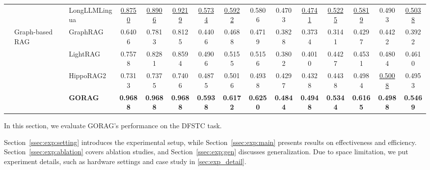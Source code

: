\begin{table}[t]
{\begin{tabular}{l|l|l|ccc|ccc|ccc|ccc}
			&    & LongLLMLingua       \cite{jiang-etal-2024-longllmlingua}              & \underline{0.8750}          &        \underline{0.8906}         & \underline{0.9219}           & \underline{0.5734}          &         \underline{0.5922}        & 0.5806           & 0.4703          &   \underline{0.4741}              & \underline{0.5225}           & \underline{0.5819}          &      0.4903           & \underline{0.5038}            \\	\cline{2-15}
			&             \multirow{4}{*}{Graph-based RAG}                         & GraphRAG      \cite{edge2024local}                     & 0.6406     &    0.7813   &   0.8125    &   0.4406    &     0.4688    &   0.4719     &     0.3828   &   0.3734    &     0.3141      &  0.4297   &    0.4422    &   0.3922           \\
			&                                     & LightRAG    \cite{guo2024lightrag}               & 0.7578     &    0.8281   &    0.8594    &  0.4906    &  0.5155    &    0.5156     &  0.3802    &  0.4010  &  0.4427    &   0.4531    & 0.4804   &  0.4610        \\
			&                                     & HippoRAG2    \cite{gutiérrez2025ragmemory}               & 0.7313     &     0.7375  &     0.7406   &    0.4875  &    0.5016  &    0.4938     &    0.4297  &   0.4328 & 0.4438     &     0.4984  &   \underline{0.5008} &    0.4953      \\
			&                                     & \textbf{GORAG}                                      & \textbf{0.9688}   & \textbf{0.9688}   &   \textbf{0.9688}&\textbf{0.5938}  &\textbf{0.6172} & \textbf{0.6250} & \textbf{0.4844}  & \textbf{0.4948} &\textbf{0.5344}  &\textbf{0.6165} & \textbf{0.4988}  & \textbf{0.5469}  \\
			\hline\hline
		\end{tabular}
	}
	\vspace{-10px}
\end{table}


In this section,
we evaluate GORAG's performance on the DFSTC task.

Section~\ref{ssec:exp:setting} introduces the experimental setup, while Section~\ref{ssec:exp:main} presents results on effectiveness and efficiency. Section~\ref{ssec:exp:ablation} covers ablation studies, and Section~\ref{ssec:exp:gen} discusses generalization. 
	Due to space limitation, we put experiment details, such as hardware settings and case study in \autoref{sec:exp_detail}.











